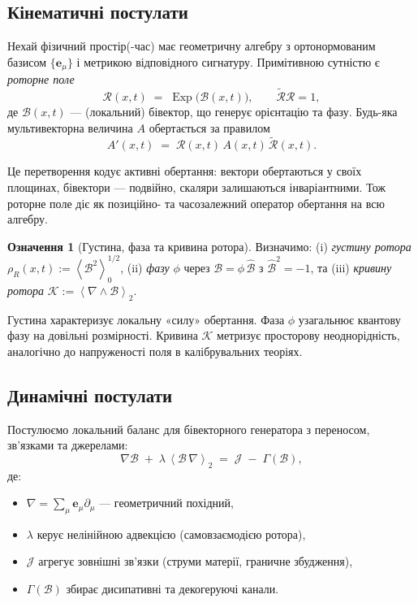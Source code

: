 \documentclass[11pt,a4paper]{article}
\newcommand{\e}{\mathbf{e}}
\newcommand{\grade}[2]{\left\langle #1 \right\rangle_{#2}}
\newcommand{\scal}[1]{\grade{#1}{0}}
\newcommand{\biv}[1]{\grade{#1}{2}}
\newcommand{\rev}[1]{\widetilde{#1}}           %
\newcommand{\Exp}{\operatorname{Exp}}
\newcommand{\Rotor}{\mathcal{R}}
\newcommand{\Biv}{\mathcal{B}}
\newcommand{\D}{\nabla}                        %
\theoremstyle{definition}
\newtheorem{definition}{Означення}
\theoremstyle{plain}
\theoremstyle{remark}
\begin{document}
\subsection{Кінематичні постулати}

Нехай фізичний простір(-час) має геометричну алгебру з ортонормованим базисом $\{\e_\mu\}$ і метрикою відповідного сигнатуру. Примітивною сутністю є \emph{роторне поле}
\begin{equation}
  \Rotor(x,t) \;=\; \Exp\!\big(\Biv(x,t)\big),
  \qquad \rev{\Rotor}\Rotor = 1,
  \label{eq:rotor}
\end{equation}
де $\Biv(x,t)$ — (локальний) бівектор, що генерує орієнтацію та фазу. Будь-яка мультивекторна величина $A$ обертається за правилом
\begin{equation}
  A'(x,t) \;=\; \Rotor(x,t)\, A(x,t)\, \rev{\Rotor}(x,t).
\end{equation}

Це перетворення кодує активні обертання: вектори обертаються у своїх площинах, бівектори — подвійно, скаляри залишаються інваріантними. Тож роторне поле діє як позиційно- та часозалежний оператор обертання на всю алгебру.

\begin{definition}[Густина, фаза та кривина ротора]
Визначимо: (i) \emph{густину ротора} $\rho_R(x,t):=\scal{\Biv^2}^{1/2}$, (ii) \emph{фазу} $\phi$ через $\Biv=\phi\,\hat{\Biv}$ з $\hat{\Biv}^2=-1$, та (iii) \emph{кривину ротора} $\mathcal{K}:=\biv{\D \wedge \Biv}$.
\end{definition}

Густина характеризує локальну «силу» обертання. Фаза $\phi$ узагальнює квантову фазу на довільні розмірності. Кривина $\mathcal{K}$ метризує просторову неоднорідність, аналогічно до напруженості поля в калібрувальних теоріях.

\subsection{Динамічні постулати}

Постулюємо локальний баланс для бівекторного генератора з переносом, зв’язками та джерелами:
\begin{equation}
  \D \Biv \;+\; \lambda\, \biv{\Biv\,\D} \;=\; \mathcal{J} \;-\; \Gamma(\Biv),
  \label{eq:rotor-dynamics}
\end{equation}
де:
\begin{itemize}[leftmargin=*,itemsep=2pt]
  \item $\D = \sum_\mu \e_\mu \partial_\mu$ — геометричний похідний,
  \item $\lambda$ керує нелінійною адвекцією (самовзаємодією ротора),
  \item $\mathcal{J}$ агрегує зовнішні зв’язки (струми матерії, граничне збудження),
  \item $\Gamma(\Biv)$ збирає дисипативні та декогеруючі канали.
\end{itemize}
\end{document}
